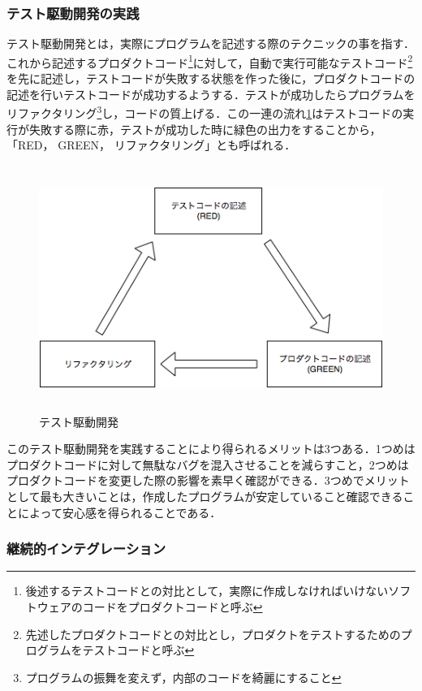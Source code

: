 \subsubsection{テスト駆動開発の実践}

テスト駆動開発とは，実際にプログラムを記述する際のテクニックの事を指す．これから記述するプロダクトコード\footnote{後述するテストコードとの対比として，実際に作成しなければいけないソフトウェアのコードをプロダクトコードと呼ぶ}に対して，自動で実行可能なテストコード\footnote{先述したプロダクトコードとの対比とし，プロダクトをテストするためのプログラムをテストコードと呼ぶ}を先に記述し，テストコードが失敗する状態を作った後に，プロダクトコードの記述を行いテストコードが成功するようする．テストが成功したらプログラムをリファクタリング\footnote{プログラムの振舞を変えず，内部のコードを綺麗にすること}し，コードの質上げる．この一連の流れ\ref{fig:tdd}はテストコードの実行が失敗する際に赤，テストが成功した時に緑色の出力をすることから，「RED， GREEN， リファクタリング」とも呼ばれる．

\begin{figure}[H]
\centering
\includegraphics[height=8cm]{./assets/images/tdd.png}
\caption{テスト駆動開発}
\label{fig:tdd}
\end{figure}


このテスト駆動開発を実践することにより得られるメリットは3つある．1つめはプロダクトコードに対して無駄なバグを混入させることを減らすこと，2つめはプロダクトコードを変更した際の影響を素早く確認ができる．3つめでメリットとして最も大きいことは，作成したプログラムが安定していること確認できることによって安心感を得られることである．

\subsubsection{継続的インテグレーション}


